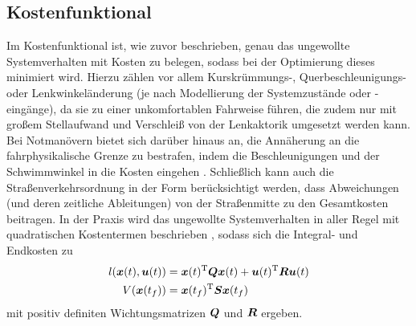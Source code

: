 \subsection{Kostenfunktional} \label{sec:direkte_methode_kostenfuktional}
Im Kostenfunktional ist, wie zuvor beschrieben, genau das ungewollte Systemverhalten mit Kosten zu belegen, sodass bei der Optimierung dieses minimiert wird. Hierzu zählen vor allem Kurskrümmungs-, Querbeschleunigungs- oder Lenkwinkeländerung
\cite{anderson2010optimal,Liu2010}
(je nach Modellierung der Systemzustände oder -eingänge), da sie zu einer unkomfortablen Fahrweise führen, die zudem nur mit großem Stellaufwand und Verschleiß von der Lenkaktorik umgesetzt werden kann. Bei Notmanövern bietet sich darüber hinaus an, die Annäherung an die fahrphysikalische Grenze zu bestrafen, indem die Beschleunigungen und der Schwimmwinkel in die Kosten eingehen
\cite{park2009obstacle, anderson2010optimal}. 
Schließlich kann auch die Straßenverkehrsordnung in der Form berücksichtigt werden, dass Abweichungen (und deren zeitliche Ableitungen) von der Straßenmitte 
\cite{park2009obstacle, Liu2010, nanao2011vehicle} zu den Gesamtkosten beitragen. In der Praxis wird das ungewollte Systemverhalten in aller Regel mit quadratischen Kostentermen beschrieben
\cite{Falcone2007,Yoon2009,park2009obstacle,anderson2010optimal,schmidt2012hierarchischer,Liu2010}, sodass sich die Integral- und Endkosten zu
\begin{align*}
l(\boldsymbol{x}(t), \boldsymbol{u}(t)) &= \boldsymbol{x}(t)^{{\rm T}} \boldsymbol{Q} \boldsymbol{x}(t) + \boldsymbol{u}(t)^{{\rm T}} \boldsymbol{R} \boldsymbol{u}(t) \\
V(\boldsymbol{x}(t_f)) &= \boldsymbol{x}(t_f)^{{\rm T}} \boldsymbol{S} \boldsymbol{x}(t_f)
\end{align*}
mit positiv definiten Wichtungsmatrizen $\boldsymbol{Q}$ und $\boldsymbol{R}$ ergeben. \\
